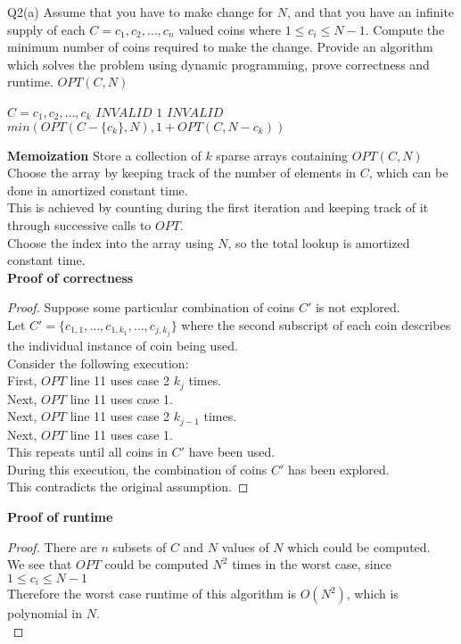 \begin{problem}
  {Q2(a)}
  Assume that you have to make change for $N$, and that you have an infinite supply of each $C = c_1, c_2, \dots, c_n$ valued coins where $1 \leq c_i \leq N-1$.
  Compute the minimum number of coins required to make the change. Provide an algorithm which solves the problem using dynamic programming, prove correctness and runtime.
  $OPT(C, N)$
  \begin{algorithmic}[1]
      \STATE $C = c_1, c_2, \dots, c_k$
      \RETURN $INVALID$
      \ENDIF
      \RETURN $1$
      \ENDIF
      \RETURN $INVALID$
      \ENDIF
      \RETURN $min(OPT(C - \{c_k\}, N), 1 + OPT(C, N-c_k))$
  \end{algorithmic}
  \noindent
  \textbf{Memoization}
  Store a collection of $k$ sparse arrays containing $OPT(C, N)$ \\
  Choose the array by keeping track of the number of elements in $C$, which can be done in amortized constant time. \\
  This is achieved by counting during the first iteration and keeping track of it through successive calls to $OPT$. \\
  Choose the index into the array using $N$, so the total lookup is amortized constant time. \\
  \noindent
  \textbf{Proof of correctness}
  \begin{proof}
      Suppose some particular combination of coins $C'$ is not explored. \\
      Let $C' = \{c_{1, 1}, \dots, c_{1, k_1}, \dots, c_{j, k_j}\}$ where the second subscript of each coin describes the individual instance of coin being used. \\
      Consider the following execution: \\
      First, $OPT$ line 11 uses case 2 $k_j$ times. \\
      Next, $OPT$ line 11 uses case 1. \\
      Next, $OPT$ line 11 uses case 2 $k_{j-1}$ times. \\
      Next, $OPT$ line 11 uses case 1. \\
      This repeats until all coins in $C'$ have been used. \\
      During this execution, the combination of coins $C'$ has been explored. \\
      This contradicts the original assumption.
  \end{proof}
  \noindent
  \textbf{Proof of runtime}
  \begin{proof}
      There are $n$ subsets of $C$ and $N$ values of $N$ which could be computed. \\
      We see that $OPT$ could be computed $N^2$ times in the worst case, since $1 \leq c_i \leq N-1$ \\
      Therefore the worst case runtime of this algorithm is $O(N^2)$, which is polynomial in $N$. \\
  \end{proof}
\end{problem}
